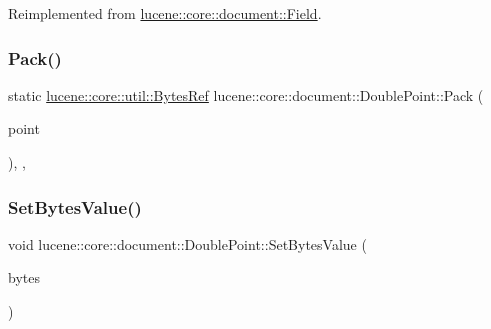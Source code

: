 Reimplemented from \mbox{\hyperlink{classlucene_1_1core_1_1document_1_1Field_a858814043215c98bacf6ecc823d078ea}{lucene\+::core\+::document\+::\+Field}}.

\mbox{\label{classlucene_1_1core_1_1document_1_1DoublePoint_a9ad090bc4fec578601b40f974302f60f}} 
\subsubsection{\texorpdfstring{Pack()}{Pack()}}
{\footnotesize\ttfamily static \mbox{\hyperlink{classlucene_1_1core_1_1util_1_1BytesRef}{lucene\+::core\+::util\+::\+Bytes\+Ref}} lucene\+::core\+::document\+::\+Double\+Point\+::\+Pack (\begin{DoxyParamCaption}\item[{const std\+::initializer\+\_\+list$<$ const double $>$ \&}]{point }\end{DoxyParamCaption})\hspace{0.3cm}{\ttfamily [inline]}, {\ttfamily [static]}, {\ttfamily [private]}}

\mbox{\label{classlucene_1_1core_1_1document_1_1DoublePoint_af6162d3a002e5cd557b63afea4efee1e}} 
\subsubsection{\texorpdfstring{Set\+Bytes\+Value()}{SetBytesValue()}}
{\footnotesize\ttfamily void lucene\+::core\+::document\+::\+Double\+Point\+::\+Set\+Bytes\+Value (\begin{DoxyParamCaption}\item[{const \mbox{\hyperlink{classlucene_1_1core_1_1util_1_1BytesRef}{lucene\+::core\+::util\+::\+Bytes\+Ref}}}]{bytes }\end{DoxyParamCaption})\hspace{0.3cm}{\ttfamily [inline]}}

